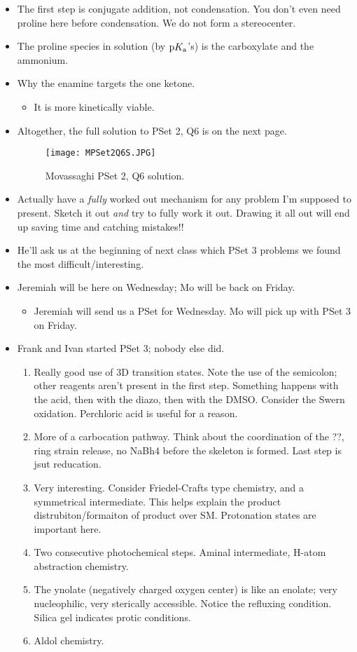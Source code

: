 \documentclass[../notes.tex]{subfiles}
\begin{document}
\begin{itemize}
    \item The first step is conjugate addition, not condensation. You don't even need proline here before condensation. We do not form a stereocenter.
    \item The proline species in solution (by $\textup{p}K_\textup{a}$'s) is the carboxylate and the ammonium.
    \item Why the enamine targets the one ketone.
    \begin{itemize}
        \item It is more kinetically viable.
    \end{itemize}
    \item Altogether, the full solution to PSet 2, Q6 is on the next page.
    \begin{figure}[h!]
        \centering
        \texttt{[image: MPSet2Q6S.JPG]}
        \caption{Movassaghi PSet 2, Q6 solution.}
        \label{fig:MPSet2Q6S}
    \end{figure}
    \pagebreak
    \item Actually have a \emph{fully} worked out mechanism for any problem I'm supposed to present. Sketch it out \emph{and} try to fully work it out. Drawing it all out will end up saving time and catching mistakes!!
    \item He'll ask us at the beginning of next class which PSet 3 problems we found the most difficult/interesting.
    \item Jeremiah will be here on Wednesday; Mo will be back on Friday.
    \begin{itemize}
        \item Jeremiah will send us a PSet for Wednesday. Mo will pick up with PSet 3 on Friday.
    \end{itemize}
    \item Frank and Ivan started PSet 3; nobody else did.
    \begin{enumerate}
        \item Really good use of 3D transition states. Note the use of the semicolon; other reagents aren't present in the first step. Something happens with the acid, then with the diazo, then with the DMSO. Consider the Swern oxidation. Perchloric acid is useful for a reason.
        \item More of a carbocation pathway. Think about the coordination of the ??, ring strain release, no NaBh4 before the skeleton is formed. Last step is jsut reducation.
        \item Very interesting. Consider Friedel-Crafts type chemistry, and a symmetrical intermediate. This helps explain the product distrubiton/formaiton of product over SM. Protonation states are important here.
        \item Two consecutive photochemical steps. Aminal intermediate, H-atom abstraction chemistry.
        \item The ynolate (negatively charged oxygen center) is like an enolate; very nucleophilic, very sterically accessible. Notice the refluxing condition. Silica gel indicates protic conditions.
        \item Aldol chemistry.
    \end{enumerate}
\end{itemize}
\end{document}
